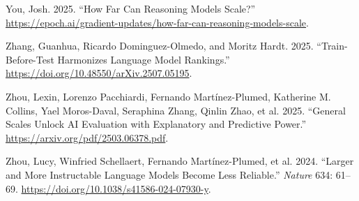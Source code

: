 \documentclass[
  letterpaper,
  DIV=11,
  numbers=noendperiod,
  oneside]{scrartcl}
\newlength{\cslhangindent}
\newenvironment{CSLReferences}[2] %
 {\begin{list}{}{%
  \setlength{\itemindent}{0pt}
  \setlength{\leftmargin}{0pt}
  \setlength{\parsep}{0pt}
  \ifodd #1
   \setlength{\leftmargin}{\cslhangindent}
   \setlength{\itemindent}{-1\cslhangindent}
  \fi
  \setlength{\itemsep}{#2\baselineskip}}}
 {\end{list}}
\begin{document}
\begin{CSLReferences}{1}{0}
You, Josh. 2025. {``How Far Can Reasoning Models Scale?''}
\url{https://epoch.ai/gradient-updates/how-far-can-reasoning-models-scale}.

Zhang, Guanhua, Ricardo Dominguez-Olmedo, and Moritz Hardt. 2025.
{``Train-Before-Test Harmonizes Language Model Rankings.''}
\url{https://doi.org/10.48550/arXiv.2507.05195}.

Zhou, Lexin, Lorenzo Pacchiardi, Fernando Martínez-Plumed, Katherine M.
Collins, Yael Moros-Daval, Seraphina Zhang, Qinlin Zhao, et al. 2025.
{``General Scales Unlock AI Evaluation with Explanatory and Predictive
Power.''} \url{https://arxiv.org/pdf/2503.06378.pdf}.

Zhou, Lucy, Winfried Schellaert, Fernando Martínez-Plumed, et al. 2024.
{``Larger and More Instructable Language Models Become Less Reliable.''}
\emph{Nature} 634: 61--69.
\url{https://doi.org/10.1038/s41586-024-07930-y}.

\end{CSLReferences}
\end{document}
